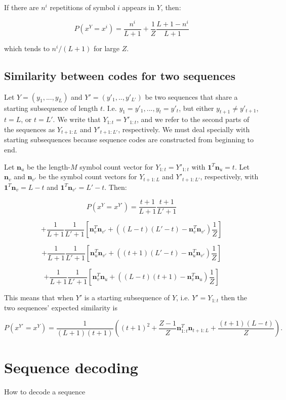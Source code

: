 \documentclass{article}
\begin{document}
If there are $n^i$ repetitions of symbol $i$ appears in $Y$, then:

$$P(x^Y = x^i) = \frac{n^i}{L+1} + \frac{1}{Z}\frac{L+1-n^i}{L+1}$$

which tends to $n^i/(L+1)$ for large $Z$.

\subsection{Similarity between codes for two sequences}

Let $Y = (y_1, ..., y_L)$ and $Y' = (y'_1, .., y'_{L'})$ be two sequences that share a starting subsequence of length $t$. I.e. $y_1 = y'_1, ..., y_t = y'_t$, but either $y_{t+1} \neq y'_{t+1}$, $t = L$, or $t = L'$. We write that $Y_{1:t} = Y'_{1:t}$, and we refer to the second parts of the sequences as $Y_{t+1:L}$ and $Y'_{t+1:L'}$, respectively. We must deal specially with starting subsequences because sequence codes are constructed from beginning to end.

Let $\mathbf{n}_u$ be the length-$M$ symbol count vector for $Y_{1:t} = Y'_{1:t}$ with $\mathbf{1}^T\mathbf{n}_u = t$. Let $\mathbf{n}_v$ and $\mathbf{n}_{v'}$ be the symbol count vectors for $Y_{t+1:L}$ and $Y'_{t+1:L'}$, respectively, with $\mathbf{1}^T\mathbf{n}_{v} = L - t$ and $\mathbf{1}^T\mathbf{n}_{v'} = L' - t$. Then:

$$P(x^Y = x^{Y'}) = \frac{t+1}{L+1}\frac{t+1}{L'+1}$$

$$+ \frac{1}{L+1}\frac{1}{L'+1}\left[\mathbf{n}^T_v\mathbf{n}_{v'} + \left((L-t)(L'-t) - \mathbf{n}^T_v\mathbf{n}_{v'} \right)\frac{1}{Z}\right]
$$

$$+\frac{1}{L+1}\frac{1}{L'+1}\left[
\mathbf{n}^T_{u}\mathbf{n}_{v'} + \left((t+1)(L'-t) - \mathbf{n}^T_{u}\mathbf{n}_{v'} \right)\frac{1}{Z}
\right]
$$

$$+\frac{1}{L+1}\frac{1}{L'+1}\left[
\mathbf{n}^T_{v}\mathbf{n}_{u} + \left((L-t)(t+1) - \mathbf{n}^T_{v}\mathbf{n}_{u} \right)\frac{1}{Z}
\right]
$$

This means that when $Y'$ is a starting subsequence of $Y$, i.e. $Y' = Y_{1:t}$ then the two sequences' expected similarity is

$$P(x^{Y'} = x^Y) = \frac{1}{(L+1)(t+1)}\left((t+1)^2 + \frac{Z-1}{Z}\mathbf{n}^T_{1:t}\mathbf{n}_{t+1:L} + \frac{(t+1)(L-t)}{Z}\right).$$

\section{Sequence decoding}
How to decode a sequence
\end{document}
